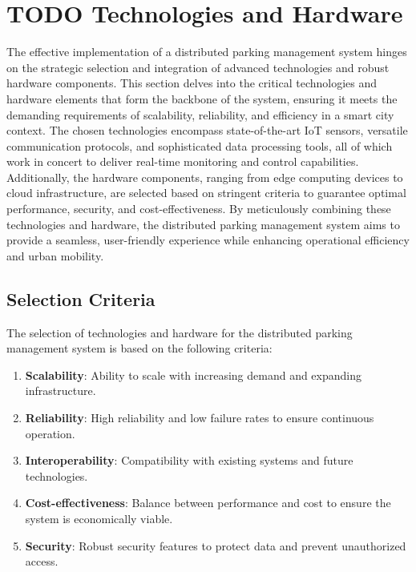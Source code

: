 \documentclass[oneside, 12pt, a4paper, draft]{book}
\begin{document}
\chapter{{\bfseries\sffamily TODO} Technologies and Hardware}
\label{sec:orgec42210}
The effective implementation of a distributed parking management system hinges on the strategic selection and integration of advanced technologies and robust hardware components. This section delves into the critical technologies and hardware elements that form the backbone of the system, ensuring it meets the demanding requirements of scalability, reliability, and efficiency in a smart city context. The chosen technologies encompass state-of-the-art IoT sensors, versatile communication protocols, and sophisticated data processing tools, all of which work in concert to deliver real-time monitoring and control capabilities. Additionally, the hardware components, ranging from edge computing devices to cloud infrastructure, are selected based on stringent criteria to guarantee optimal performance, security, and cost-effectiveness. By meticulously combining these technologies and hardware, the distributed parking management system aims to provide a seamless, user-friendly experience while enhancing operational efficiency and urban mobility.
\section{Selection Criteria}
\label{sec:orge5a7cdb}
The selection of technologies and hardware for the distributed parking management system is based on the following criteria:

\begin{enumerate}
\item \textbf{\textbf{Scalability}}: Ability to scale with increasing demand and expanding infrastructure.
\item \textbf{\textbf{Reliability}}: High reliability and low failure rates to ensure continuous operation.
\item \textbf{\textbf{Interoperability}}: Compatibility with existing systems and future technologies.
\item \textbf{\textbf{Cost-effectiveness}}: Balance between performance and cost to ensure the system is economically viable.
\item \textbf{\textbf{Security}}: Robust security features to protect data and prevent unauthorized access.
\end{enumerate}
\end{document}
